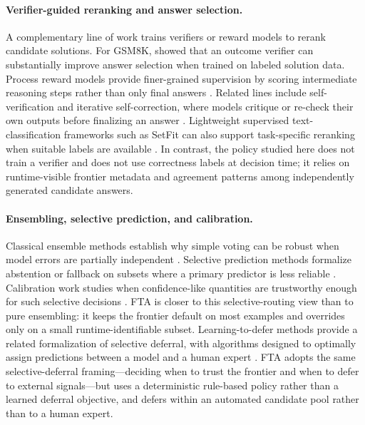 \documentclass[smallcondensed]{svjour3}
\begin{document}
\paragraph{Verifier-guided reranking and answer selection.}
A complementary line of work trains verifiers or reward models to rerank candidate solutions.
For GSM8K, \citet{cobbe2021training} showed that an outcome verifier can substantially improve answer selection when trained on labeled solution data.
Process reward models provide finer-grained supervision by scoring intermediate reasoning steps rather than only final answers \citep{lightman2024lets}.
Related lines include self-verification and iterative self-correction, where models critique or re-check their own outputs before finalizing an answer \citep{weng2023largelanguagemodelsbetter,madaan2023selfrefine}.
Lightweight supervised text-classification frameworks such as SetFit can also support task-specific reranking when suitable labels are available \citep{tunstall2022efficient}.
In contrast, the policy studied here does not train a verifier and does not use correctness labels at decision time; it relies on runtime-visible frontier metadata and agreement patterns among independently generated candidate answers.

\paragraph{Ensembling, selective prediction, and calibration.}
Classical ensemble methods establish why simple voting can be robust when model errors are partially independent \citep{dietterich2000ensemble}.
Selective prediction methods formalize abstention or fallback on subsets where a primary predictor is less reliable \citep{geifman2017selectiveclassificationdeepneural}.
Calibration work studies when confidence-like quantities are trustworthy enough for such selective decisions \citep{guo2017calibrationmodernneuralnetworks}.
FTA is closer to this selective-routing view than to pure ensembling: it keeps the frontier default on most examples and overrides only on a small runtime-identifiable subset.
Learning-to-defer methods provide a related formalization of selective deferral, with algorithms designed to optimally assign predictions between a model and a human expert \citep{mozannar2023who,mao2023defer}.
FTA adopts the same selective-deferral framing---deciding when to trust the frontier and when to defer to external signals---but uses a deterministic rule-based policy rather than a learned deferral objective, and defers within an automated candidate pool rather than to a human expert.
\end{document}

